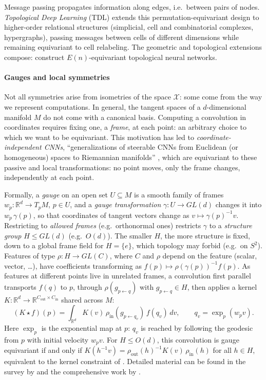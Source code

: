 \documentclass[mathematics,review,submit,moreauthors]{Definitions/mdpi}
\begin{document}
Message passing propagates information along edges, i.e.\ between pairs of nodes.
\emph{Topological Deep Learning} (TDL) \citep{papillon2023,papamarkou2024} extends this permutation-equivariant design to higher-order relational structures (simplicial, cell and combinatorial complexes, hypergraphs), passing messages between cells of different dimensions while remaining equivariant to cell relabeling.
The geometric and topological extensions compose: \citet{battiloro2024} construct $E(n)$-equivariant topological neural networks.

\paragraph{Gauges and local symmetries}
Not all symmetries arise from isometries of the space $\mathcal X$: some come from the way we represent computations.
In general, the tangent spaces of a $d$-dimensional manifold $M$ do not come with a canonical basis.
Computing a convolution in coordinates requires fixing one, a \emph{frame}, at each point: an arbitrary choice to which we want to be equivariant.
This motivation has led to \emph{coordinate-independent CNNs}, ``generalizations of steerable CNNs from Euclidean (or homogeneous) spaces to Riemannian manifolds'' \citep{weiler2021}, which are equivariant to these passive and local transformations: no point moves, only the frame changes, independently at each point.

Formally, a \emph{gauge} on an open set $U\subseteq M$ is a smooth family of frames $w_p:\mathbb{R}^d\to T_pM$, $p\in U$, and a \emph{gauge transformation} $\gamma:U\to GL(d)$ changes it into $w_p\,\gamma(p)$, so that coordinates of tangent vectors change as $v\mapsto\gamma(p)^{-1}v$.
Restricting to \emph{allowed frames} (e.g.\ orthonormal ones) restricts $\gamma$ to a \emph{structure group} $H\leq GL(d)$ (e.g.\ $O(d)$).
The smaller $H$, the more structure is fixed, down to a global frame field for $H=\{e\}$, which topology may forbid (e.g.\ on $S^2$).
Features of type $\rho:H\to GL(C)$, where $C$ and $\rho$ depend on the feature (scalar, vector, \dots), have coefficients transforming as $f(p)\mapsto\rho(\gamma(p))^{-1}f(p)$.
As features at different points live in unrelated frames, a convolution first parallel transports $f(q)$ to $p$, through $\rho(g_{p\leftarrow q})$ with $g_{p\leftarrow q}\in H$, then applies a kernel $K:\mathbb{R}^d\to\mathbb{R}^{C_{\mathrm{out}}\times C_{\mathrm{in}}}$ shared across $M$:
\[
    (K\star f)(p)=\int_{\mathbb{R}^d}K(v)\,\rho_{\mathrm{in}}(g_{p\leftarrow q_v})\,f(q_v)\,dv,\qquad q_v=\exp_p(w_pv).
\]
Here $\exp_p$ is the exponential map at $p$: $q_v$ is reached by following the geodesic from $p$ with initial velocity $w_pv$.
For $H\leq O(d)$, this convolution is gauge equivariant if and only if $K(h^{-1}v)=\rho_{\mathrm{out}}(h)^{-1}K(v)\,\rho_{\mathrm{in}}(h)$ for all $h\in H$, equivalent to the kernel constraint of .
Detailed material can be found in the survey by \citet{gerken2021} and the comprehensive work by \citet{weiler2021,weiler2026}.
\end{document}
